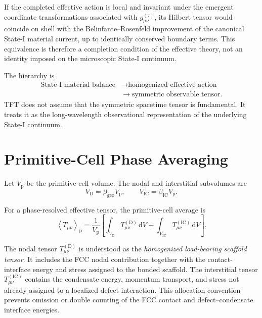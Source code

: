 If the completed effective action is local and invariant under the emergent coordinate transformations associated with $g_{\mu\nu}^{(\tau)}$, its Hilbert tensor would coincide on shell with the Belinfante--Rosenfeld improvement of the canonical State-I material current, up to identically conserved boundary terms. This equivalence is therefore a completion condition of the effective theory, not an identity imposed on the microscopic State-I continuum.

The hierarchy is
\begin{equation}
    \begin{aligned}
    \text{State-I material balance} &\longrightarrow \text{homogenized effective action} \\
    &\longrightarrow \text{symmetric observable tensor}.
    \end{aligned}
\end{equation}
TFT does not assume that the symmetric spacetime tensor is fundamental. It treats it as the long-wavelength observational representation of the underlying State-I continuum.

\section{Primitive-Cell Phase Averaging}

Let $V_{\mathrm{p}}$ be the primitive-cell volume. The nodal and interstitial subvolumes are
\begin{equation}
    V_{\mathrm{D}} = \beta_{\mathrm{geo}}V_{\mathrm{p}}, \qquad V_{\mathrm{IC}} = \beta_{\mathrm{IC}}V_{\mathrm{p}}.
\end{equation}

For a phase-resolved effective tensor, the primitive-cell average is
\begin{equation}
    \left\langle T_{\mu\nu}\right\rangle_{\mathrm{p}} = \frac{1}{V_{\mathrm{p}}} \left[ \int_{V_{\mathrm{D}}} T_{\mu\nu}^{(\mathrm{D})}\,\mathrm{d}V + \int_{V_{\mathrm{IC}}} T_{\mu\nu}^{(\mathrm{IC})}\,\mathrm{d}V \right].
\end{equation}

The nodal tensor $T_{\mu\nu}^{(\mathrm{D})}$ is understood as the \emph{homogenized load-bearing scaffold tensor}. It includes the FCC nodal contribution together with the contact-interface energy and stress assigned to the bonded scaffold. The interstitial tensor $T_{\mu\nu}^{(\mathrm{IC})}$ contains the condensate energy, momentum transport, and stress not already assigned to a localized defect interaction. This allocation convention prevents omission or double counting of the FCC contact and defect--condensate interface energies.

